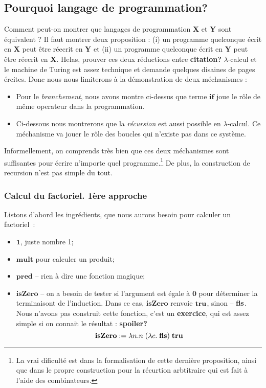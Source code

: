 \subsection*{Pourquoi langage de programmation?}

Comment peut-on montrer que langages de programmation \textbf{X} et \textbf{Y} sont équivalent ?
Il faut montrer deux proposition : (i) un programme quelconque écrit en \textbf{X} peut être réecrit en \textbf{Y} et (ii) un programme quelconque écrit en \textbf{Y} peut être réecrit en \textbf{X}.
Helas, prouver ces deux réductions entre \textbf{citation?} $\lambda$-calcul et le machine de Turing est assez technique et demande quelques disaines de pages ércites.
Donc nous nous limiterons à la démonstration de deux méchanismes :
\begin{itemize}
	\item Pour le \emph{branchement}, nous avons montre ci-dessus que terme $\mathbf{if}$ joue le rôle de même operateur dans la programmation.
	\item Ci-dessous nous montrerons que la \emph{récursion} est aussi possible en $\lambda$-calcul. Ce méchanisme va jouer le rôle des boucles qui n'existe pas dans ce système.
\end{itemize}
Informellement, on comprends très bien que ces deux méchanismes sont suffisantes pour écrire n'importe quel programme.\footnote{La vrai dificulté est dans la formalisation de cette dernière proposition, ainsi que dans le propre construction pour la récurtion arbtitraire qui est fait à l'aide des combinateurs.}
De plus, la construction de recursion n'est pas simple du tout.

\subsubsection*{Calcul du factoriel. 1ère approche}
Listons d'abord les ingrédients, que nous aurons besoin pour calculer un factoriel~:
\begin{itemize}
	\item $\mathbf{1}$, juste nombre 1;
	\item $\mathbf{mult}$ pour calculer un produit;
	\item $\mathbf{pred}$ -- rien à dire une fonction magique;
	\item $\mathbf{isZero}$ -- on a besoin de tester si l'argument est égale à $\mathbf{0}$ pour déterminer la terminaisont de l'induction. Dans ce cas, $\mathbf{isZero}$ renvoie $\mathbf{tru}$, sinon -- $\mathbf{fls}$.
	Nous n'avons pas construit cette fonction, c'est un \textbf{exercice}, qui est assez simple si on connait le résultat : \textbf{spoiler?} $$\mathbf{isZero} := \lambda n. n \; (\lambda c. \; \mathbf{fls}) \; \mathbf{tru}$$
\end{itemize}
